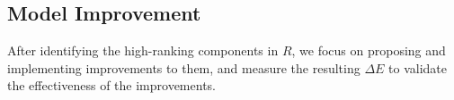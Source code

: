 \subsection{Model Improvement}
After identifying the high-ranking components in \( R \), we focus on proposing and implementing improvements to them, and measure the resulting \( \Delta E \) to validate the effectiveness of the improvements.




